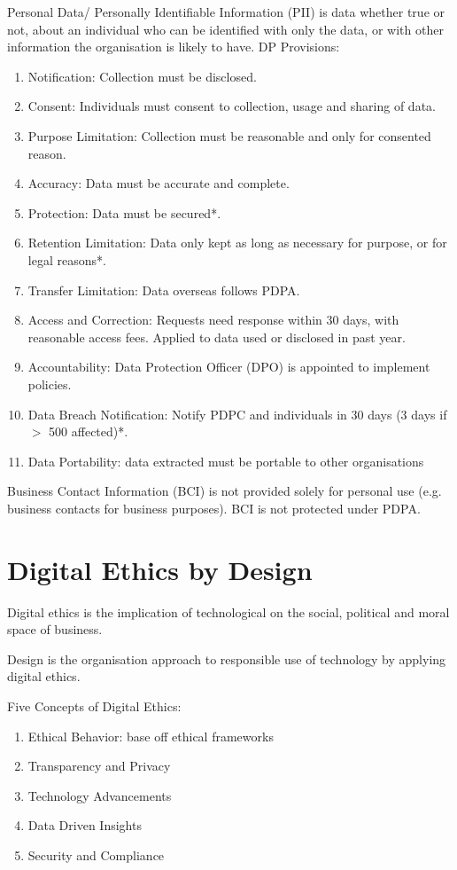 \documentclass[12pt, a4paper]{article}
\begin{document}
\begin{multicols*}{3}
Personal Data/ Personally Identifiable Information (PII) is data whether true or not, about an individual who can be identified with only the data, or with other information the organisation is likely to have. DP Provisions:
\begin{enumerate}[\roman*.]
  \item Notification: Collection must be disclosed. 
  \item Consent: Individuals must consent to collection, usage and sharing of data.
  \item Purpose Limitation: Collection must be reasonable and only for consented reason.
  \item Accuracy: Data must be accurate and complete.
  \item Protection: Data must be secured*.
  \item Retention Limitation: Data only kept as long as necessary for purpose, or for legal reasons*.
  \item Transfer Limitation: Data overseas follows PDPA.
  \item Access and Correction: Requests need response within 30 days, with reasonable access fees. Applied to data used or disclosed in past year.
  \item Accountability: Data Protection Officer (DPO) is appointed to implement policies.
  \item Data Breach Notification: Notify PDPC and individuals in 30 days (3 days if $>$ 500 affected)*.
  \item Data Portability: data extracted must be portable to other organisations
\end{enumerate}

Business Contact Information (BCI) is not provided solely for personal use (e.g. business contacts for business purposes). BCI is not protected under PDPA.

\section{Digital Ethics by Design}
Digital ethics is the implication of technological on the social, political and moral space of business.

Design is the organisation approach to responsible use of technology by applying digital ethics.

Five Concepts of Digital Ethics:
\begin{enumerate}[\roman*.]
  \item Ethical Behavior: base off ethical frameworks
  \item Transparency and Privacy
  \item Technology Advancements
  \item Data Driven Insights
  \item Security and Compliance
\end{enumerate}


\end{multicols*}
\end{document}

